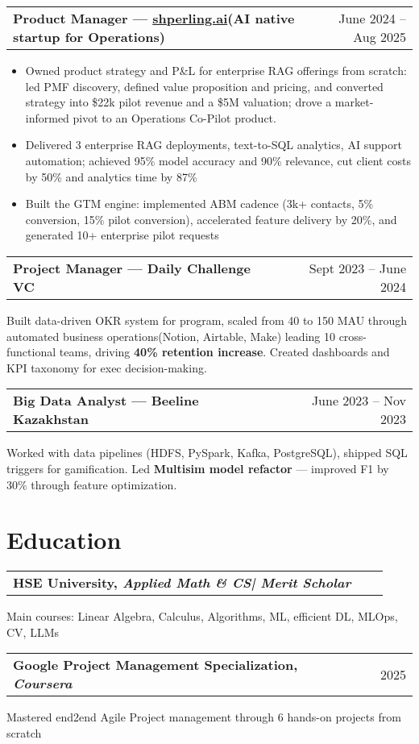 \documentclass[a4paper,12pt]{article}
\makeatletter
\newenvironment{jobshort}[2]
    {
    \begin{tabularx}{\linewidth}{@{}l X r@{}}
    \textbf{#1} & \hfill &  #2 \\[0.25pt]
    \end{tabularx}
    }
    {
    }
\newenvironment{joblong}[2]
    {
    \begin{tabularx}{\linewidth}{@{}l X r@{}}
    \textbf{#1} & \hfill &  #2 \\[0.25pt]
    \end{tabularx}
    \begin{minipage}[t]{\linewidth}
    \begin{itemize}[leftmargin=1em,label=--]
    }
    {
    \end{itemize}
    \end{minipage}    
    }
\makeatother
\begin{document}
\begin{joblong}{Product Manager — \href{https://shperling.ai}{shperling.ai}(AI native startup for Operations)}{June 2024 – Aug 2025}
\item Owned product strategy and P\&L for enterprise RAG offerings from scratch: led PMF discovery, defined value proposition and pricing, and converted strategy into \$22k pilot revenue and a \$5M valuation; drove a market-informed pivot to an Operations Co-Pilot product.
\item Delivered 3 enterprise RAG deployments, text-to-SQL analytics, AI support automation; achieved 95\% model accuracy and 90\% relevance, cut client costs by 50\+\% and analytics time by 87\%
\item Built the GTM engine: implemented ABM cadence (3k+ contacts, 5\% conversion, 15\% pilot conversion), accelerated feature delivery by 20\%, and generated 10+ enterprise pilot requests
\end{joblong}


\begin{jobshort}{Project Manager — Daily Challenge VC}{Sept 2023 – June 2024}
Built data-driven OKR system for program, scaled from 40 to 150 MAU through automated business operations(Notion, Airtable, Make) leading 10 cross-functional teams, driving \textbf{40\% retention increase}. Created dashboards and KPI taxonomy for exec decision-making.
\end{jobshort}


\begin{jobshort}{Big Data Analyst — Beeline Kazakhstan}{June 2023 – Nov 2023}
Worked with data pipelines (HDFS, PySpark, Kafka, PostgreSQL), shipped SQL triggers for gamification. Led \textbf{Multisim model refactor} — improved F1 by 30\% through feature optimization.
\end{jobshort}
\section{Education}
\begin{jobshort}{HSE University, \textit{Applied Math \& CS| Merit Scholar}}{}
\end{jobshort}
\noindent Main courses: Linear Algebra, Calculus, Algorithms, ML, efficient DL, MLOps, CV, LLMs

\begin{jobshort}{Google Project Management Specialization, \textit{Coursera}}{2025}
\end{jobshort}
\noindent Mastered end2end Agile Project management through 6 hands-on projects from scratch
\end{document}
